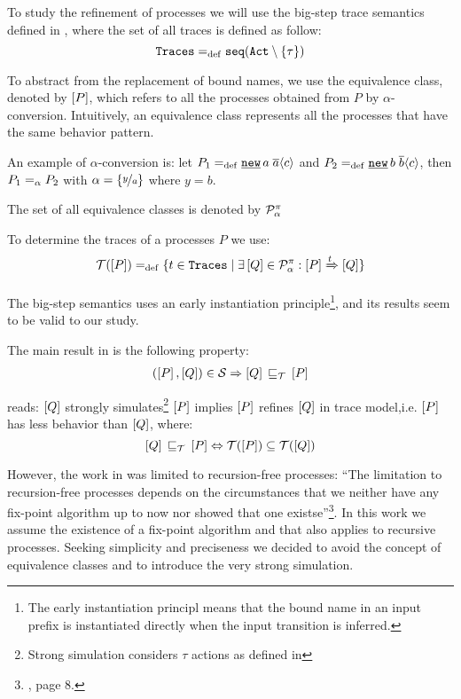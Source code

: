 To study the refinement of \picalc{} processes we will use the big-step trace semantics defined in \cite{gieseking}, where the set of all traces is defined as follow:
\[\tr \define \seqset{\actions\setminus\set{\tau}}\]

To abstract from the replacement of bound names, we use the equivalence class, denoted by $\left[P\right]$, which refers to all the processes obtained from $P$ by $\alpha$-conversion. Intuitively, an equivalence class represents all the processes that have the same behavior pattern.

An example of $\alpha$-conversion is: let $P_1\define\procres{a}{\out{a}{c}}$ and $P_2\define\procres{b}{\out{b}{c}}$, then $P_1 =_\alpha{} P_2$ with $\alpha = \left\{\nicefrac{y}{a}\right\}$ where $y = b$.

The set of all equivalence classes is denoted by $\mathcal P^{\pi}_\alpha$ 

To determine the traces of a processes $P$ we use:
\begin{align}
    \traces[P] \define \{t\in \tr \mid \exists \ec{Q}\in\procsApha: \ec{P} \bigstep{t} \ec{Q}\}
\label{determine_trace}
\end{align}

The big-step semantics uses an early instantiation principle\footnote{The early instantiation principl means that the bound name in an input prefix is instantiated directly when the input transition is inferred.}, and its results seem to be valid to our study.

The main result in \cite{gieseking} is the following property:
\begin{align}
    (\ec{P},\ec{Q})\in{}\simu \Rightarrow \ec{Q} \refi \ec{P} \label{property1}
\end{align}

 reads: $\left[Q\right]$ strongly simulates\footnote{Strong simulation considers $\tau$ actions as defined in } $\left[P\right]$ implies $\left[P\right]$ refines $\left[Q\right]$ in trace model,i.e. $\left[P\right]$ has less behavior than $\left[Q\right]$, where:
\[\ec{Q}\refi \ec{P} \Leftrightarrow \traces[P]\subseteq\traces[Q]\]

However, the work in \cite{gieseking} was limited to recursion-free processes: ``The limitation to recursion-free processes depends on the circumstances that we neither have any fix-point algorithm up to now nor showed that one existse''\footnote{\cite{gieseking}, page $8$.}. In this work we assume the existence of a fix-point algorithm and that  also applies to recursive processes.
Seeking simplicity and preciseness we decided to avoid the concept of equivalence classes and to introduce the very strong simulation.
